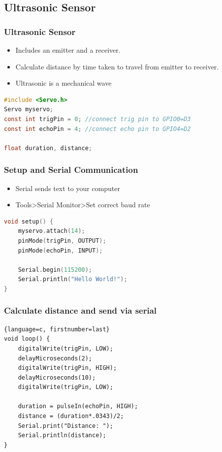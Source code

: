 \documentclass[compress, aspectratio=32]{beamer}
\begin{document}
\subsection{Ultrasonic Sensor}
\begin{frame}[fragile]
    \frametitle{Ultrasonic Sensor}
    \begin{itemize}
        \item Includes an emitter and a receiver.
        \item Calculate distance by time taken to travel from emitter to receiver.
        \item Ultrasonic is a mechanical wave
    \end{itemize}
    \begin{lstlisting}[language=c]
#include <Servo.h>
Servo myservo;
const int trigPin = 0; //connect trig pin to GPIO0=D3
const int echoPin = 4; //connect echo pin to GPIO4=D2

float duration, distance;
    \end{lstlisting}
\end{frame}

\begin{frame}[fragile]
    \frametitle{Setup and Serial Communication}
    \begin{itemize}
        \item Serial sends text to your computer
        \item Tools>Serial Monitor>Set correct baud rate
    \end{itemize}
    \begin{lstlisting}[language=c, firstnumber=last]
void setup() {
    myservo.attach(14);
    pinMode(trigPin, OUTPUT);
    pinMode(echoPin, INPUT);
    
    Serial.begin(115200);
    Serial.println("Hello World!");
}
    \end{lstlisting}
\end{frame}

\begin{frame}[fragile]
    \frametitle{Calculate distance and send via serial}
    \begin{lstlisting}{language=c, firstnumber=last}
void loop() {
    digitalWrite(trigPin, LOW);
    delayMicroseconds(2);
    digitalWrite(trigPin, HIGH);
    delayMicroseconds(10);
    digitalWrite(trigPin, LOW);

    duration = pulseIn(echoPin, HIGH);
    distance = (duration*.0343)/2;
    Serial.print("Distance: ");
    Serial.println(distance);
}
    \end{lstlisting}
\end{frame}
\end{document}
